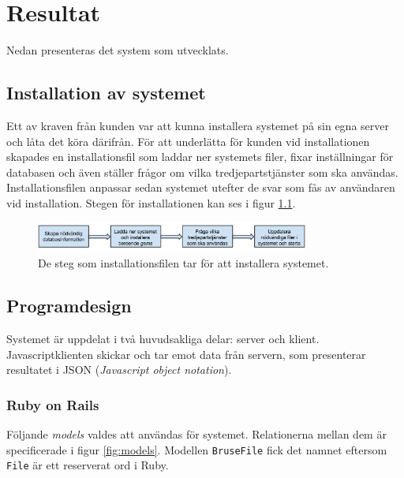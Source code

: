 \chapter{Resultat}

Nedan presenteras det system som utvecklats.

\section{Installation av systemet}
Ett av kraven från kunden var att kunna installera systemet på sin egna server
och låta det köra därifrån. För att underlätta för kunden vid installationen
skapades en installationsfil som laddar ner systemets filer, fixar
inställningar för databasen och även ställer frågor om vilka
tredjepartstjänster som ska användas. Installationsfilen anpassar sedan
systemet utefter de svar som fås av användaren vid installation. Stegen för
installationen kan ses i figur \ref{fig:installation}.

\begin{figure}[!h]
\centering
\includegraphics[width=0.8\textwidth]{figures/installation.png}
\caption{De steg som installationsfilen tar för att installera systemet.}
\label{fig:installation}
\end{figure}

\section{Programdesign}

Systemet är uppdelat i två huvudsakliga delar: server och klient.
Javascriptklienten skickar och tar emot data från servern, som presenterar
resultatet i JSON (\emph{Javascript object notation}).

\subsection{Ruby on Rails}\label{sec:ror}

Följande \emph{models} valdes att användas för systemet. Relationerna mellan
dem är specificerade i figur \ref{fig:models}. Modellen \texttt{BruseFile} fick
det namnet eftersom \texttt{File} är ett reserverat ord i Ruby.

